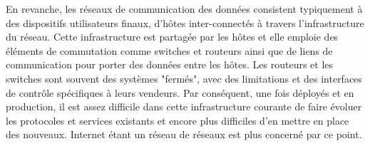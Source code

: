 En revanche, les réseaux de communication des données consistent typiquement à des dispositifs utilisateurs finaux, d'hôtes inter-connectés à travers l'infrastructure du réseau. Cette infrastructure est partagée par les hôtes et elle emploie des éléments de commutation comme switches et routeurs ainsi que de liens de communication pour porter des données entre les hôtes. Les routeurs et les switches sont souvent des systèmes "fermés", avec des limitations et des interfaces de contrôle spécifiques à leurs vendeurs. Par conséquent, une fois déployés et en production, il est assez difficile dans cette infrastructure courante de faire évoluer les protocoles et services existants et encore plus difficiles d'en mettre en place des nouveaux. Internet étant un réseau de réseaux est plus concerné par ce point. \cite{SurveySDNArchi}







